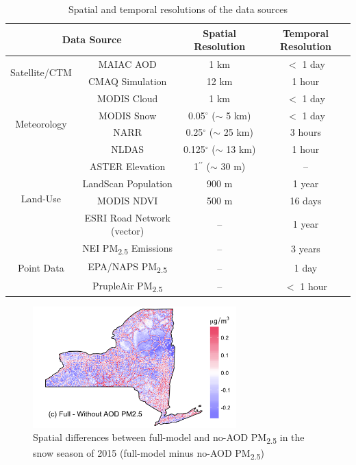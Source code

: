 \documentclass[11pt]{article}
\newcommand{\tsub}{\textsubscript}
\begin{document}
\newpage
\begin{table}[H]
    \centering
    \caption{Spatial and temporal resolutions of the data sources}
    \begin{tabular}{c|c|c|c}
        \hline
        \multicolumn{2}{c|}{Data Source} & Spatial Resolution & Temporal Resolution \\
        \hline
        \multirow{2}{*}{Satellite/CTM} & MAIAC AOD & 1 km & $<$ 1 day \\
        & CMAQ Simulation & 12 km & 1 hour \\
        \hline
        \multirow{4}{*}{Meteorology} & MODIS Cloud & 1 km & $<$ 1 day \\
        & MODIS Snow & 0.05$^{\circ}$ ($\sim$ 5 km) & $<$ 1 day \\
        & NARR & 0.25$^{\circ}$ ($\sim$ 25 km) & 3 hours\\
        & NLDAS & 0.125$^{\circ}$ ($\sim$ 13 km) & 1 hour \\
        \hline
        \multirow{4}{*}{Land-Use} & ASTER Elevation & 1$^{\prime\prime}$ ($\sim$ 30 m) & -- \\
        & LandScan Population & 900 m & 1 year \\
        & MODIS NDVI & 500 m & 16 days \\
        & ESRI Road Network (vector) & -- & 1 year \\
        \hline
        \multirow{3}{*}{Point Data} & NEI PM\tsub{2.5} Emissions  & -- & 3 years \\
        & EPA/NAPS PM\tsub{2.5} & -- & 1 day \\
        & PrupleAir PM\tsub{2.5} & -- & $<$ 1 hour \\
        \hline
    \end{tabular}
    \label{tab:res}
\end{table}

\begin{figure}[H]
    \centering
    \includegraphics[width=0.7\textwidth]{img/no_aod.png}
    \caption{Spatial differences between full-model and no-AOD PM\tsub{2.5} in the snow season of 2015 (full-model minus no-AOD PM\tsub{2.5})}
    \label{fig:noaod}
\end{figure}
\end{document}
